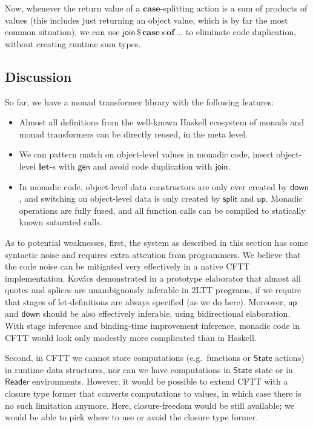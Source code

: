 \documentclass[acmsmall,screen,review,anonymous]{acmart}
\newcommand{\mit}[1]{{\mathsf{#1}}}
\newcommand{\msf}[1]{{\mathsf{#1}}}
\newcommand{\mbf}[1]{{\mathbf{#1}}}
\newcommand{\of}{\mbf{of}\,}
\newcommand{\vx}{\mathsf{x}}
\newcommand{\Reader}{\msf{Reader}}
\newcommand{\case}{\mbf{case\,}}
\theoremstyle{remark}
\newcommand{\mup}{\mit{up}}
\newcommand{\mdown}{\mit{down}}
\newcommand{\gen}{\mit{gen}}
\newcommand{\dlr}{\,\$\,}
\newcommand{\State}{\msf{State}}
\newcommand{\join}{\mit{join}}
\begin{document}
Now, whenever the return value of a $\mbf{case}$-splitting action is a sum of
products of values (this includes just returning an object value, which is by
far the most common situation), we can use $\join \dlr \case \vx\,\of ...$ to
eliminate code duplication, without creating runtime sum types.


\subsection{Discussion}

So far, we have a monad transformer library with the following features:
\begin{itemize}
\item Almost all definitions from the well-known Haskell ecosystem of monads and monad transformers
      can be directly reused, in the meta level.
\item We can pattern match on object-level values in monadic code, insert object-level $\mbf{let}$-s
      with $\gen$ and avoid code duplication with $\join$.
\item In monadic code, object-level data constructors are only ever created by
      $\mdown$, and switching on object-level data is only created by $\mit{split}$
      and $\mup$. Monadic operations are fully fused, and all function calls can be
      compiled to statically known saturated calls.
\end{itemize}

As to potential weaknesses, first, the system as described in this section has
some syntactic noise and requires extra attention from programmers.  We believe
that the code noise can be mitigated very effectively in a native CFTT
implementation. Kovács \cite{TODO} demonstrated in a prototype elaborator that
almost all quotes and splices are unambiguously inferable in 2LTT programs, if
we require that stages of let-definitions are always specified (as we do
here). Moreover, $\mup$ and $\mdown$ should be also effectively inferable, using
bidirectional elaboration. With stage inference and binding-time improvement
inference, monadic code in CFTT would look only modestly more complicated than
in Haskell.

Second, in CFTT we cannot store computations (e.g.\ functions or $\State$
actions) in runtime data structures, nor can we have computations in $\State$
state or in $\Reader$ environments. However, it would be possible to extend CFTT
with a closure type former that converts computations to values, in which case
there is no such limitation anymore. Here, closure-freedom would be still
available; we would be able to pick where to use or avoid the closure type
former.
\end{document}
